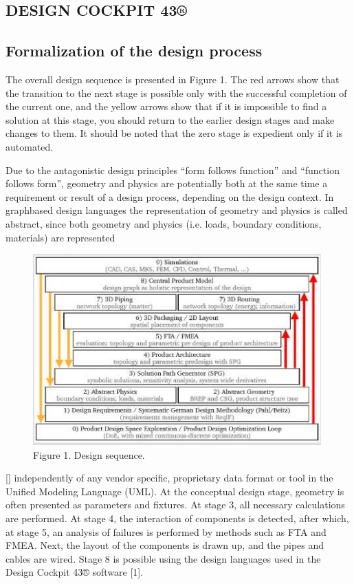\documentclass[8pt,twocolumn]{article}
\begin{document}
\begin{center}
\section{DESIGN COCKPIT 43®}    
\end{center}
\subsection{Formalization of the design process}
The overall design sequence is presented in Figure 1. The red arrows show that the transition to the next stage is possible only with the successful completion of the current one, and the yellow arrows show that if it is impossible to find a solution at this stage, you should return to the earlier design stages and make changes to them. It should be noted that the zero stage is expedient only if it is automated.

Due to the antagonistic design principles “form follows function” and “function follows form”, geometry and physics are potentially both at the same time a requirement or result of a design process, depending on the design context. In graphbased design languages the representation of geometry and physics is called abstract, since both geometry and physics (i.e. loads, boundary conditions, materials) are represented \begin{figure}[h]
    \centering
    \includegraphics[scale=0.7]{Figure1.png}
    \caption{Figure 1. Design sequence.}
    \label{Fig1:image}
\end{figure}[]
independently of any vendor specific, proprietary data format or tool in the Unified Modeling Language (UML). At the conceptual design stage, geometry is often presented as parameters and fixtures. At stage 3, all necessary calculations are performed. At stage 4, the interaction of components is detected, after which, at stage 5, an analysis of failures is performed by methods such as FTA and FMEA. Next, the layout of the components is drawn up, and the pipes and cables are wired. Stage 8 is possible using the design languages used in the Design Cockpit 43® software [1].
\end{document}
